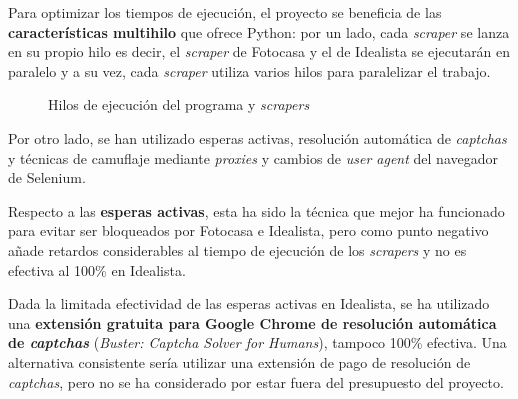 \documentclass[12pt]{article}
\begin{document}
Para optimizar los tiempos de ejecución, el proyecto se beneficia de las \textbf{características multihilo} que ofrece Python: por un lado, cada \textit{scraper} se lanza en su propio hilo \textemdash es decir, el \textit{scraper} de Fotocasa y el de Idealista se ejecutarán en paralelo \textemdash y a su vez, cada \textit{scraper} utiliza varios hilos para paralelizar el trabajo.

\begin{figure}[h]
	\centering
	\caption{\vspace{1.5em}Hilos de ejecución del programa y \textit{scrapers}}
	\vspace{-2em}
\end{figure}

Por otro lado, se han utilizado esperas activas, resolución automática de \textit{captchas} y técnicas de camuflaje mediante \textit{proxies} y cambios de \textit{user agent} del navegador de Selenium.

\newpage
Respecto a las \textbf{esperas activas}, esta ha sido la técnica que mejor ha funcionado para evitar ser bloqueados por Fotocasa e Idealista, pero como punto negativo añade retardos considerables al tiempo de ejecución de los \textit{scrapers} y no es efectiva al 100\% en Idealista.

Dada la limitada efectividad de las esperas activas en Idealista, se ha utilizado una \textbf{extensión gratuita para Google Chrome de resolución automática de \textit{captchas}} (\textit{Buster: Captcha Solver for Humans}), tampoco 100\% efectiva. Una alternativa consistente sería utilizar una extensión de pago de resolución de \textit{captchas}, pero no se ha considerado por estar fuera del presupuesto del proyecto.
\end{document}
